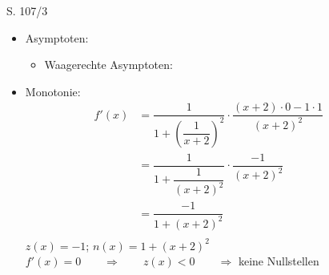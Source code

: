 \begin{Exercise}{S. 107/3}{}
\begin{enumerate}
\begin{enumerate}[label=\alph*),leftmargin=*]
{\begin{itemize}[leftmargin=*]
{\begin{align*}
                        \lim\limits_{x \to -\infty} \arctan\left(\overbrace{\left[\dfrac{1}{\underbrace{x+2}_{\textcolor{myg}{-\infty}}}\right]}^{\textcolor{myg}{0^{-}}}\right) &= 0^{-}; \qquad \qquad \lim\limits_{x \to +\infty} \arctan\left(\overbrace{\left[\dfrac{1}{\underbrace{x+2}_{\textcolor{myg}{+\infty}}}\right]}^{\textcolor{myg}{0^{+}}}\right) &= 0^{+} &&\\[2.0ex]
                        \lim\limits_{x \to -2^{-}} \arctan\left(\overbrace{\left[\dfrac{1}{\underbrace{x+2}_{\textcolor{myg}{0^{-}}}}\right]}^{\textcolor{myg}{-\infty}}\right) &= - \dfrac{\pi}{2}^{+}; \qquad \qquad \lim\limits_{x \to -2^{+}} \arctan\left(\overbrace{\left[\dfrac{1}{\underbrace{x+2}_{\textcolor{myg}{0^{+}}}}\right]}^{\textcolor{myg}{+\infty}}\right) &= \dfrac{\pi}{2}^{-} && \\[-3.0ex]
                    \end{align*}
                    }
                \item Asymptoten: \\[-2.0ex]{
                    \begin{itemize}
                        \item Waagerechte Asymptoten: 
                    \end{itemize}
                    }
                \item Monotonie: \\[-3.0ex]{
                    \begin{align*}
                        f'(x) &= \dfrac{1}{1 + \left(\dfrac{1}{x+2}\right)^{2}} \cdot \dfrac{\left(x+2\right) \cdot 0 - 1 \cdot 1}{\left(x+2\right)^{2}} &&\\[1.5ex]
                        &= \dfrac{1}{1 + \dfrac{1}{\left(x+2\right)^{2}}} \cdot \dfrac{-1}{\left(x+2\right)^{2}} &&\\[1.5ex]
                        &= \dfrac{-1}{1 + \left(x+2\right)^{2}} &&\\[-2.0ex]
                    \end{align*}
                    $z(x) = -1$; \qquad $n(x) = 1 + \left(x+2\right)^{2}$\\[1.0ex]
                    $f'(x) = 0 \qquad \Rightarrow \qquad z(x) < 0 \qquad \Rightarrow$ \quad keine Nullstellen\\[1.0ex]
}
\end{itemize}}
\end{enumerate}
\end{enumerate}
\end{Exercise}
